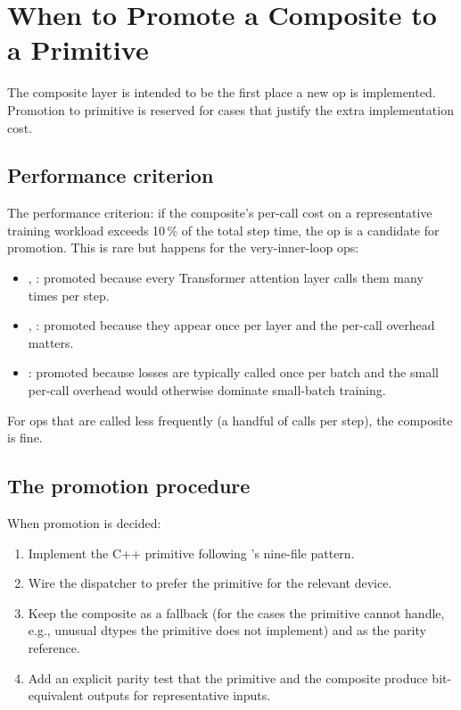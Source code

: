 \section{When to Promote a Composite to a Primitive}
\label{sec:composite_ops:promotion}

The composite layer is intended to be the first place a new op is
implemented. Promotion to primitive is reserved for cases that
justify the extra implementation cost.

\subsection{Performance criterion}
\label{ssec:composite_ops:perf_criterion}

The performance criterion: if the composite's per-call cost on a
representative training workload exceeds 10\,\% of the total step
time, the op is a candidate for promotion. This is rare but
happens for the very-inner-loop ops:

\begin{itemize}
  \item {}, : promoted because
    every Transformer attention layer calls them many times per
    step.
  \item {}, : promoted because
    they appear once per layer and the per-call overhead matters.
  \item {}: promoted because losses are
    typically called once per batch and the small per-call
    overhead would otherwise dominate small-batch training.
\end{itemize}

For ops that are called less frequently (a handful of
 calls per step), the composite is fine.

\subsection{The promotion procedure}
\label{ssec:composite_ops:promotion_procedure}

When promotion is decided:

\begin{enumerate}
  \item Implement the C++ primitive following
    's nine-file pattern.
  \item Wire the dispatcher to prefer the primitive for the
    relevant device.
  \item Keep the composite as a fallback (for the cases the
    primitive cannot handle, e.g., unusual dtypes the primitive
    does not implement) and as the parity reference.
  \item Add an explicit parity test that the primitive and the
    composite produce bit-equivalent outputs for representative
    inputs.
\end{enumerate}

